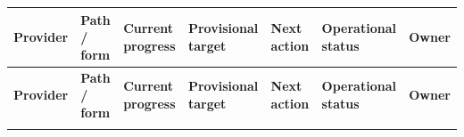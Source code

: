 \documentclass[9pt,a4paper]{article}
\begin{document}
\begin{longtable}{L{2.25cm} L{4.05cm} L{6.15cm} L{3.35cm} L{5.35cm} L{3.35cm} L{0.75cm}}
\toprule
{}
\color{white}\bfseries Provider &
\color{white}\bfseries Path / form &
\color{white}\bfseries Current progress &
\color{white}\bfseries Provisional target &
\color{white}\bfseries Next action &
\color{white}\bfseries Operational status &
\color{white}\bfseries Owner \\
\midrule
\endfirsthead
\toprule
{}
\color{white}\bfseries Provider &
\color{white}\bfseries Path / form &
\color{white}\bfseries Current progress &
\color{white}\bfseries Provisional target &
\color{white}\bfseries Next action &
\color{white}\bfseries Operational status &
\color{white}\bfseries Owner \\
\midrule
\endhead
\bottomrule
\endfoot


\end{longtable}
\end{document}
